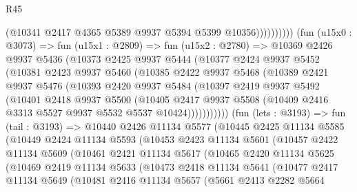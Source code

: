 \begin{lexlean}{R45}
\begin{coremodule}
                          (@10341 @2417 @4365 @5389 @9937 @5394 @5399 @10356))))))))))
        (fun (u15x0 : @3073) =>
        fun (u15x1 : @2809) =>
        fun (u15x2 : @2780) =>
        @10369
          @2426
          @9937
          @5436
          (@10373
            @2425
            @9937
            @5444
            (@10377
              @2424
              @9937
              @5452
              (@10381
                @2423
                @9937
                @5460
                (@10385
                  @2422
                  @9937
                  @5468
                  (@10389
                    @2421
                    @9937
                    @5476
                    (@10393
                      @2420
                      @9937
                      @5484
                      (@10397
                        @2419
                        @9937
                        @5492
                        (@10401
                          @2418
                          @9937
                          @5500
                          (@10405
                            @2417
                            @9937
                            @5508
                            (@10409 @2416 @3313 @5527 @9937 @5532 @5537 @10424)))))))))))
        (fun (lets : @3193) =>
        fun (tail : @3193) =>
        @10440
          @2426
          @11134
          @5577
          (@10445
            @2425
            @11134
            @5585
            (@10449
              @2424
              @11134
              @5593
              (@10453
                @2423
                @11134
                @5601
                (@10457
                  @2422
                  @11134
                  @5609
                  (@10461
                    @2421
                    @11134
                    @5617
                    (@10465
                      @2420
                      @11134
                      @5625
                      (@10469
                        @2419
                        @11134
                        @5633
                        (@10473
                          @2418
                          @11134
                          @5641
                          (@10477
                            @2417
                            @11134
                            @5649
                            (@10481
                              @2416
                              @11134
                              @5657
                              (@5661
                                @2413
                                @2282
                                @5664

\end{coremodule}
\end{lexlean}
